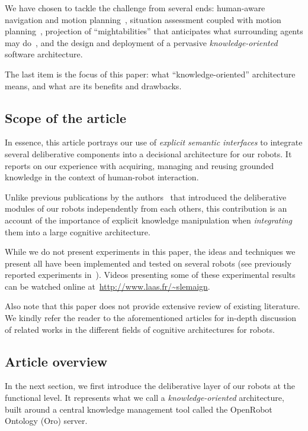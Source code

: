 \documentclass[letterpaper, 10 pt, conference]{ieeeconf}  %
\begin{document}
We have chosen to tackle the challenge from several ends: human-aware
navigation and motion planning~\cite{Mainprice2011}, situation assessment
coupled with motion planning~\cite{Mainprice2012}, projection of
``mightabilities'' that anticipates what surrounding agents may
do~\cite{Pandey2011}, and the design and deployment of a pervasive
\emph{knowledge-oriented} software architecture.

The last item is the focus of this paper: what ``knowledge-oriented''
architecture means, and what are its benefits and drawbacks.

\subsection{Scope of the article}

In essence, this article portrays our use of \emph{explicit semantic
interfaces} to integrate several deliberative components into a decisional
architecture for our robots. It reports on our experience with acquiring,
managing and reusing grounded knowledge in the context of human-robot
interaction.

Unlike previous publications by the authors~\cite{Pandey2011, Lemaignan2010,
Ros2010b, Lemaignan2011a, Warnier2012a, Alami2011, Sisbot2011, Alili2009} that
introduced the deliberative modules of our robots independently from each
others, this contribution is an account of the importance of explicit knowledge
manipulation when \emph{integrating} them into a large cognitive architecture.

While we do not present experiments in this paper, the ideas and techniques we
present all have been implemented and tested on several robots (see previously
reported experiments in~\cite{Lemaignan2010, Ros2010b, Lemaignan2011a,
Warnier2012a}). Videos presenting some of these experimental results can
be watched online at~\url{http://www.laas.fr/~slemaign}.

Also note that this paper does not provide extensive review of existing
literature. We kindly refer the reader to the aforementioned articles for
in-depth discussion of related works in the different fields of cognitive
architectures for robots.

\subsection{Article overview}

In the next section, we first introduce the deliberative layer of our robots at
the functional level. It represents what we call a \emph{knowledge-oriented}
architecture, built around a central knowledge management tool called the
OpenRobot Ontology ({\sc Oro}) server.
\end{document}
